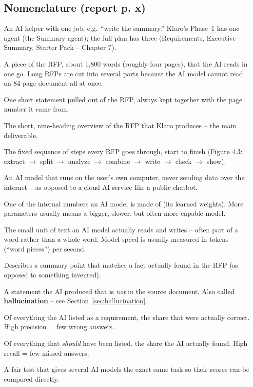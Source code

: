 \documentclass[11pt,a4paper]{article}
\begin{document}
\subsection{Nomenclature (report p. x)}
\begin{description}[style=nextline,leftmargin=1.6cm]
  \item[Agent] An AI helper with one job, e.g.\ ``write the summary.'' Klaro's Phase~1 has one agent
    (the Summary agent); the full plan has three (Requirements, Executive Summary, Starter Pack --
    Chapter 7).
  \item[Part (chunk)] A piece of the RFP, about 1{,}800 words (roughly four pages), that the AI reads
    in one go. Long RFPs are cut into several parts because the AI model cannot read an 84-page
    document all at once.
  \item[Fact] One short statement pulled out of the RFP, always kept together with the page number it
    came from.
  \item[Executive summary] The short, nine-heading overview of the RFP that Klaro produces -- the
    main deliverable.
  \item[Pipeline] The fixed sequence of steps every RFP goes through, start to finish (Figure 4.3:
    extract $\to$ split $\to$ analyze $\to$ combine $\to$ write $\to$ check $\to$ show).
  \item[Local model] An AI model that runs on the user's own computer, never sending data over the
    internet -- as opposed to a cloud AI service like a public chatbot.
  \item[Parameter] One of the internal numbers an AI model is made of (its learned weights). More
    parameters usually means a bigger, slower, but often more capable model.
  \item[Word piece (token)] The small unit of text an AI model actually reads and writes -- often
    part of a word rather than a whole word. Model speed is usually measured in tokens (``word
    pieces'') per second.
  \item[Backed by facts] Describes a summary point that matches a fact actually found in the RFP
    (as opposed to something invented).
  \item[Made-up information] A statement the AI produced that is \emph{not} in the source document.
    Also called \textbf{hallucination} -- see Section~\ref{sec:hallucination}.
  \item[Precision] Of everything the AI listed as a requirement, the share that were actually
    correct. High precision = few wrong answers.
  \item[Recall] Of everything that \emph{should} have been listed, the share the AI actually found.
    High recall = few missed answers.
  \item[Benchmark] A fair test that gives several AI models the exact same task so their scores can
    be compared directly.
\end{description}
\end{document}
